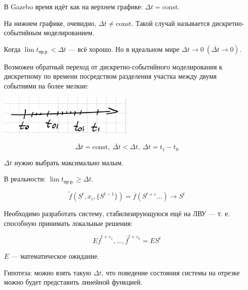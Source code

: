 \documentclass[12pt]{article}
\begin{document}
В Gazebo время идёт как на верхнем графике: $\Delta t = \text{const}$.

На нижнем графике, очевидно, $\Delta t \neq \text{const}$. Такой случай называется дискретно-событийным моделированием.

Когда $\lim t_\text{пр.р.} < \Delta t$ — всё хорошо. Но в идеальном мире $\Delta t \rightarrow 0 \ (\overline{\Delta t} \rightarrow 0)$.

Возможен обратный переход от дискретно-событийного моделирования к дискретному по времени посредством разделения участка между двумя событиями на более мелкие:

\includegraphics[width=0.5\textwidth]{graphics/pic03.png}

\[
    \overline{\Delta t} = \text{const},\ \overline{\Delta t} < \Delta t,\ \Delta t = t_1 - t_0
\]

$\Delta t$ нужно выбрать максимально малым.

В реальности: $\lim t_{\text{пр.р.}} \geq \Delta t$.

\[
    \widetilde{f}(S^t, x_i, \{S^{t - 1}\}) = \overline{f}(S^{t + \varepsilon}...) \rightarrow S^t
\]

Необходимо разработать систему, стабилизирующуюся ещё на ЛВУ — т. е. способную принимать локальные решения:

\[
    E{\overline{f}^{t + \varepsilon_1},..., \overline{f}^{t + \varepsilon_k}} = ES^t
\]

$E$ — математическое ожидание.

Гипотеза: можно взять такую $\Delta t$, что поведение состояния системы на отрезке можно будет представить линейной функцией.
\end{document}
